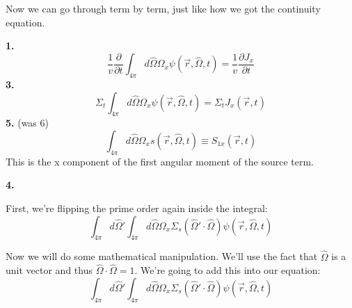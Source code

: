 \documentclass[12pt]{article}
\newcommand{\vOmega}{\ensuremath{\hat{\Omega}}}
\begin{document}
Now we can go through term by term, just like how we got the continuity equation.

\textbf{1.}
\begin{equation}
\frac{1}{v}\frac{\partial}{\partial t} \int_{4\pi} d\vOmega \Omega_x \psi(\vec{r}, \vOmega, t) = \boxed{\frac{1}{v}\frac{\partial J_x}{\partial t}}
\end{equation}
\textbf{3.} 
\begin{equation}
\Sigma_t \int_{4\pi} d\vOmega \Omega_x \psi(\vec{r}, \vOmega, t) = \boxed{\Sigma_t J_x(\vec{r}, t)}
\end{equation}
\textbf{5.} (was 6)
\begin{equation}
\int_{4\pi} d\vOmega \Omega_x s(\vec{r}, \vOmega, t) \equiv \boxed{S_{1x}(\vec{r}, t)}
\end{equation}
This is the x component of the first angular moment of the source term. 

\textbf{4.} 

First, we're flipping the prime order again inside the integral:
\[\int_{4\pi} d\vOmega' \int_{4\pi} d\vOmega \Omega_x \Sigma_s(\vOmega' \cdot \vOmega) \psi(\vec{r}, \vOmega, t)\]

Now we will do some mathematical manipulation. We'll use the fact that $\vOmega$ is a unit vector and thus $\vOmega \cdot \vOmega = 1$. We're going to add this into our equation:
\[ \int_{4\pi} d\vOmega' \int_{4\pi} d\vOmega \Omega_x \Sigma_s(\vOmega' \cdot \vOmega) \psi(\vec{r}, \vOmega, t)\]



\end{document}

